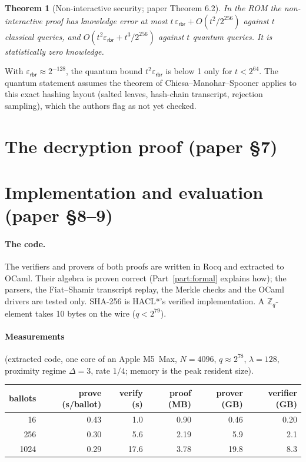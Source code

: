 \documentclass[11pt,a4paper]{article}
\newcommand{\Zq}{\mathbb{Z}_q}
\newcommand{\epsrbr}{\varepsilon_{\mathsf{rbr}}}
\theoremstyle{definition}
\theoremstyle{plain}
\newtheorem{theorem}[definition]{Theorem}
\begin{document}
\begin{theorem}[Non-interactive security; paper Theorem 6.2]
In the ROM the non-interactive proof has knowledge error at most $t\,\epsrbr+O(t^2/2^{256})$ against $t$
classical queries, and $O(t^2\epsrbr+t^3/2^{256})$ against $t$ quantum queries. It is statistically zero
knowledge.
\end{theorem}

\begin{caution}
With $\epsrbr\approx 2^{-128}$, the quantum bound $t^2\epsrbr$ is below 1 only for $t<2^{64}$. The quantum
statement assumes the theorem of Chiesa--Manohar--Spooner applies to this exact hashing layout (salted
leaves, hash-chain transcript, rejection sampling), which the authors flag as not yet checked.
\end{caution}

\section{The decryption proof (paper \S7)}
\label{sec:dec}
\section{Implementation and evaluation (paper \S8--9)}
\label{sec:eval}

\paragraph{The code.} The verifiers and provers of both proofs are written in Rocq and extracted to
OCaml. Their algebra is proven correct (Part~\ref{part:formal} explains how); the parsers, the
Fiat--Shamir transcript replay, the Merkle checks and the OCaml drivers are tested only. SHA-256 is
HACL*'s verified implementation. A $\Zq$-element takes 10 bytes on the wire ($q<2^{79}$).

\paragraph{Measurements} (extracted code, one core of an Apple M5~Max, $N=4096$, $q\approx2^{78}$,
$\lambda=128$, proximity regime $\Delta=3$, rate $1/4$; memory is the peak resident size).
\begin{center}\small
\begin{tabular}{@{}rrrrrr@{}}
\toprule
ballots & prove (s/ballot) & verify (s) & proof (MB) & prover (GB) & verifier (GB)\\\midrule
16 & 0.43 & 1.0 & 0.90 & 0.46 & 0.20\\
256 & 0.30 & 5.6 & 2.19 & 5.9 & 2.1\\
1024 & 0.29 & 17.6 & 3.78 & 19.8 & 8.3\\
\bottomrule
\end{tabular}
\end{center}
\end{document}

